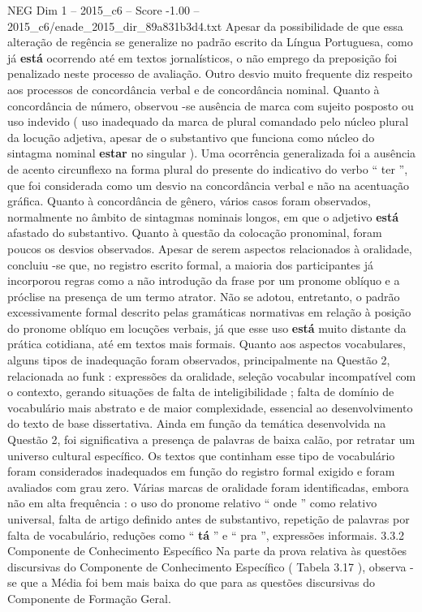 \begin{textsample}{NEG Dim 1 – 2015\_c6 – Score -1.00 – 2015\_c6/enade\_2015\_dir\_89a831b3d4.txt}
Apesar da possibilidade de que essa alteração de regência se generalize no padrão escrito da Língua Portuguesa, como já \textbf{está} ocorrendo até em textos jornalísticos, o não emprego da preposição foi penalizado neste processo de avaliação.
Outro desvio muito frequente diz respeito aos processos de concordância verbal e de concordância nominal.
Quanto à concordância de número, observou -se ausência de marca com sujeito posposto ou uso indevido ( uso inadequado da marca de plural comandado pelo núcleo plural da locução adjetiva, apesar de o substantivo que funciona como núcleo do sintagma nominal \textbf{estar} no singular ).
Uma ocorrência generalizada foi a ausência de acento circunflexo na forma plural do presente do indicativo do verbo “ ter ”, que foi considerada como um desvio na concordância verbal e não na acentuação gráfica.
Quanto à concordância de gênero, vários casos foram observados, normalmente no âmbito de sintagmas nominais longos, em que o adjetivo \textbf{está} afastado do substantivo.
Quanto à questão da colocação pronominal, foram poucos os desvios observados.
Apesar de serem aspectos relacionados à oralidade, concluiu -se que, no registro escrito formal, a maioria dos participantes já incorporou regras como a não introdução da frase por um pronome oblíquo e a próclise na presença de um termo atrator.
Não se adotou, entretanto, o padrão excessivamente formal descrito pelas gramáticas normativas em relação à posição do pronome oblíquo em locuções verbais, já que esse uso \textbf{está} muito distante da prática cotidiana, até em textos mais formais.
Quanto aos aspectos vocabulares, alguns tipos de inadequação foram observados, principalmente na Questão 2, relacionada ao funk : expressões da oralidade, seleção vocabular incompatível com o contexto, gerando situações de falta de inteligibilidade ; falta de domínio de vocabulário mais abstrato e de maior complexidade, essencial ao desenvolvimento do texto de base dissertativa.
Ainda em função da temática desenvolvida na Questão 2, foi significativa a presença de palavras de baixa calão, por retratar um universo cultural específico.
Os textos que continham esse tipo de vocabulário foram considerados inadequados em função do registro formal exigido e foram avaliados com grau zero.
Várias marcas de oralidade foram identificadas, embora não em alta frequência : o uso do pronome relativo “ onde ” como relativo universal, falta de artigo definido antes de substantivo, repetição de palavras por falta de vocabulário, reduções como “ \textbf{tá} ” e “ pra ”, expressões informais. 3.3.2 Componente de Conhecimento Específico Na parte da prova relativa às questões discursivas do Componente de Conhecimento Específico ( Tabela 3.17 ), observa -se que a Média foi bem mais baixa do que para as questões discursivas do Componente de Formação Geral.

\end{textsample}
